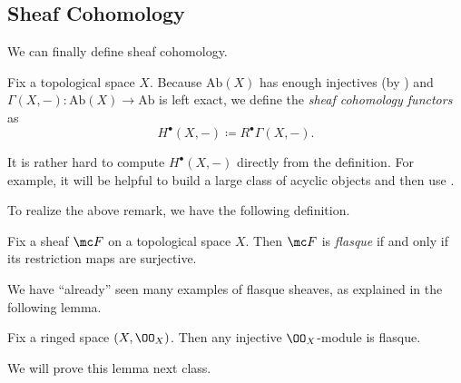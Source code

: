 \documentclass[../notes.tex]{subfiles}
\begin{document}
\subsection{Sheaf Cohomology}
We can finally define sheaf cohomology.
\begin{definition}
	Fix a topological space $X$. Because $\mathrm{Ab}(X)$ has enough injectives (by ) and $\Gamma(X,-)\colon\mathrm{Ab}(X)\to\mathrm{Ab}$ is left exact, we define the \textit{sheaf cohomology functors} as
	\[H^\bullet(X,-)\coloneqq R^\bullet\Gamma(X,-).\]
\end{definition}
\begin{remark}
	It is rather hard to compute $H^\bullet(X,-)$ directly from the definition. For example, it will be helpful to build a large class of acyclic objects and then use .
\end{remark}
To realize the above remark, we have the following definition.
\begin{definition}[flasque]
	Fix a sheaf $\mc F$ on a topological space $X$. Then $\mc F$ is \textit{flasque} if and only if its restriction maps are surjective.
\end{definition}
We have ``already'' seen many examples of flasque sheaves, as explained in the following lemma.
\begin{lemma}
	Fix a ringed space $(X,\OO_X)$. Then any injective $\OO_X$-module is flasque.
\end{lemma}
We will prove this lemma next class.
\end{document}

